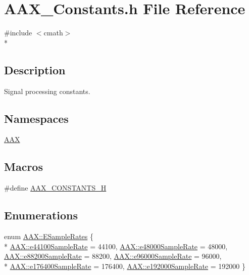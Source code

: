 \hypertarget{a00188}{}\section{A\+A\+X\+\_\+\+Constants.\+h File Reference}
\label{a00188}
{\ttfamily \#include $<$cmath$>$}\\*


\subsection{Description}
Signal processing constants. 

\subsection*{Namespaces}
\begin{DoxyCompactItemize}
\item 
 \hyperlink{a00288}{A\+A\+X}
\end{DoxyCompactItemize}
\subsection*{Macros}
\begin{DoxyCompactItemize}
\item 
\#define \hyperlink{a00188_a433d1b1995004b862ef494090e51e673}{A\+A\+X\+\_\+\+C\+O\+N\+S\+T\+A\+N\+T\+S\+\_\+\+H}
\end{DoxyCompactItemize}
\subsection*{Enumerations}
\begin{DoxyCompactItemize}
\item 
enum \hyperlink{a00288_a60daf5874c02a01d2af8c582c0643e2d}{A\+A\+X\+::\+E\+Sample\+Rates} \{ \\*
\hyperlink{a00288_a60daf5874c02a01d2af8c582c0643e2da0fabb364c77d1597745ea7faede310a9}{A\+A\+X\+::e44100\+Sample\+Rate} = 44100, 
\hyperlink{a00288_a60daf5874c02a01d2af8c582c0643e2dabf618a3399a754a6ec3a367c102f8850}{A\+A\+X\+::e48000\+Sample\+Rate} = 48000, 
\hyperlink{a00288_a60daf5874c02a01d2af8c582c0643e2da6b2f92d94b3c151993d544d924321620}{A\+A\+X\+::e88200\+Sample\+Rate} = 88200, 
\hyperlink{a00288_a60daf5874c02a01d2af8c582c0643e2da1161e560e2b301b8b45d17083696915e}{A\+A\+X\+::e96000\+Sample\+Rate} = 96000, 
\\*
\hyperlink{a00288_a60daf5874c02a01d2af8c582c0643e2da17be0028e4f2ca09f095573240cef263}{A\+A\+X\+::e176400\+Sample\+Rate} = 176400, 
\hyperlink{a00288_a60daf5874c02a01d2af8c582c0643e2da755a96e92d23adf2ad3546551e2ad49c}{A\+A\+X\+::e192000\+Sample\+Rate} = 192000
 \}
\end{DoxyCompactItemize}
